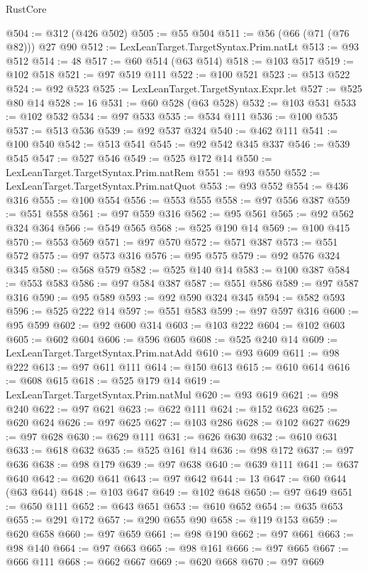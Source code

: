 \begin{lexlean}{RustCore}
\begin{coremodule}
@504 := @312 (@426 @502)
@505 := @55 @504
@511 := @56 (@66 (@71 (@76 @82))) @27 @90
@512 := LexLeanTarget.TargetSyntax.Prim.natLt
@513 := @93 @512
@514 := 48
@517 := @60 @514 (@63 @514)
@518 := @103 @517
@519 := @102 @518
@521 := @97 @519 @111
@522 := @100 @521
@523 := @513 @522
@524 := @92 @523
@525 := LexLeanTarget.TargetSyntax.Expr.let
@527 := @525 @80 @14
@528 := 16
@531 := @60 @528 (@63 @528)
@532 := @103 @531
@533 := @102 @532
@534 := @97 @533
@535 := @534 @111
@536 := @100 @535
@537 := @513 @536
@539 := @92 @537 @324
@540 := @462 @111
@541 := @100 @540
@542 := @513 @541
@545 := @92 @542 @345 @337
@546 := @539 @545
@547 := @527 @546
@549 := @525 @172 @14
@550 := LexLeanTarget.TargetSyntax.Prim.natRem
@551 := @93 @550
@552 := LexLeanTarget.TargetSyntax.Prim.natQuot
@553 := @93 @552
@554 := @436 @316
@555 := @100 @554
@556 := @553 @555
@558 := @97 @556 @387
@559 := @551 @558
@561 := @97 @559 @316
@562 := @95 @561
@565 := @92 @562 @324 @364
@566 := @549 @565
@568 := @525 @190 @14
@569 := @100 @415
@570 := @553 @569
@571 := @97 @570
@572 := @571 @387
@573 := @551 @572
@575 := @97 @573 @316
@576 := @95 @575
@579 := @92 @576 @324 @345
@580 := @568 @579
@582 := @525 @140 @14
@583 := @100 @387
@584 := @553 @583
@586 := @97 @584 @387
@587 := @551 @586
@589 := @97 @587 @316
@590 := @95 @589
@593 := @92 @590 @324 @345
@594 := @582 @593
@596 := @525 @222 @14
@597 := @551 @583
@599 := @97 @597 @316
@600 := @95 @599
@602 := @92 @600 @314
@603 := @103 @222
@604 := @102 @603
@605 := @602 @604
@606 := @596 @605
@608 := @525 @240 @14
@609 := LexLeanTarget.TargetSyntax.Prim.natAdd
@610 := @93 @609
@611 := @98 @222
@613 := @97 @611 @111
@614 := @150 @613
@615 := @610 @614
@616 := @608 @615
@618 := @525 @179 @14
@619 := LexLeanTarget.TargetSyntax.Prim.natMul
@620 := @93 @619
@621 := @98 @240
@622 := @97 @621
@623 := @622 @111
@624 := @152 @623
@625 := @620 @624
@626 := @97 @625
@627 := @103 @286
@628 := @102 @627
@629 := @97 @628
@630 := @629 @111
@631 := @626 @630
@632 := @610 @631
@633 := @618 @632
@635 := @525 @161 @14
@636 := @98 @172
@637 := @97 @636
@638 := @98 @179
@639 := @97 @638
@640 := @639 @111
@641 := @637 @640
@642 := @620 @641
@643 := @97 @642
@644 := 13
@647 := @60 @644 (@63 @644)
@648 := @103 @647
@649 := @102 @648
@650 := @97 @649
@651 := @650 @111
@652 := @643 @651
@653 := @610 @652
@654 := @635 @653
@655 := @291 @172
@657 := @290 @655 @90
@658 := @119 @153
@659 := @620 @658
@660 := @97 @659
@661 := @98 @190
@662 := @97 @661
@663 := @98 @140
@664 := @97 @663
@665 := @98 @161
@666 := @97 @665
@667 := @666 @111
@668 := @662 @667
@669 := @620 @668
@670 := @97 @669

\end{coremodule}
\end{lexlean}

